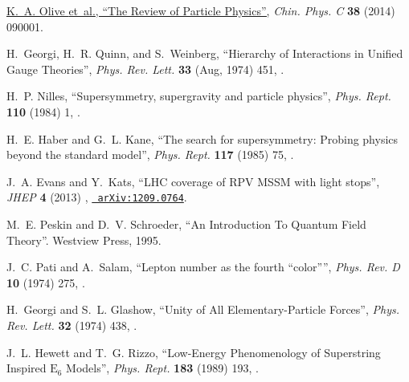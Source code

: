 \documentclass[12pt]{thesis}  %
\begin{document}
\begin{thebibliography}{100}
\href {http://pdg.lbl.gov} {K.~A. Olive {et~al.}, ``The Review of Particle
  Physics'',} \textit{ Chin. Phys. C} \textbf{ 38} (2014) 090001.

\hrefCMSnoop {} {H.~Georgi, H.~R. Quinn, and S.~Weinberg, ``Hierarchy of
  Interactions in Unified Gauge Theories'',} \textit{ Phys. Rev. Lett.}
  \textbf{ 33} (Aug, 1974) 451,
  \href{http://dx.doi.org/10.1103/PhysRevLett.33.451}{}.

\hrefCMSnoop {} {H.~P. Nilles, ``Supersymmetry, supergravity and particle
  physics'',} \textit{ Phys. Rept.} \textbf{ 110} (1984) 1,
\href{http://dx.doi.org/10.1016/0370-1573(84)90008-5}{}.

\hrefCMSnoop {} {H.~E. Haber and G.~L. Kane, ``The search for supersymmetry:
  Probing physics beyond the standard model'',} \textit{ Phys. Rept.} \textbf{
  117} (1985) 75,
\href{http://dx.doi.org/10.1016/0370-1573(85)90051-1}{}.

\hrefCMSnoop {} {J.~A. Evans and Y.~Kats, ``LHC coverage of RPV MSSM with light
  stops'',} \textit{ JHEP} \textbf{ 4} (2013)
  \href{http://dx.doi.org/10.1007/JHEP04(2013)028}{},
  \href{http://www.arXiv.org/abs/1209.0764}{\texttt{ arXiv:1209.0764}}.

M.~E. Peskin and D.~V. Schroeder, ``{An Introduction To Quantum Field
  Theory}''.
\newblock Westview Press, 1995.

\hrefCMSnoop {} {J.~C. Pati and A.~Salam, ``Lepton number as the fourth
  ``color'''',} \textit{ Phys. Rev. D} \textbf{ 10} (1974) 275,
  \href{http://dx.doi.org/10.1103/PhysRevD.10.275}{}.

\hrefCMSnoop {} {H.~Georgi and S.~L. Glashow, ``Unity of All
  Elementary-Particle Forces'',} \textit{ Phys. Rev. Lett.} \textbf{ 32} (1974)
  438,
  \href{http://dx.doi.org/10.1103/PhysRevLett.32.438}{}.

\hrefCMSnoop {} {J.~L. Hewett and T.~G. Rizzo, ``{Low-Energy Phenomenology of
  Superstring Inspired $\text{E}_{6}$ Models}'',} \textit{ Phys. Rept.}
  \textbf{ 183} (1989) 193,
\href{http://dx.doi.org/10.1016/0370-1573(89)90071-9}{}.


\end{thebibliography}
\end{document}
